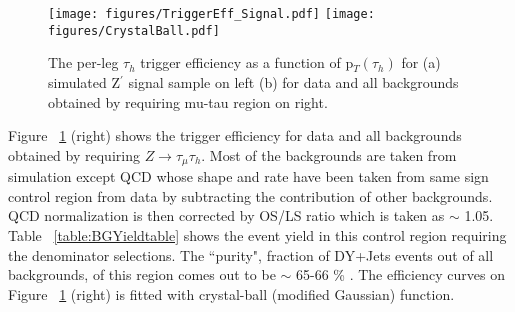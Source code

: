\begin{figure}[tbh!]
  \centering
    \texttt{[image: figures/TriggerEff\_Signal.pdf]}
    \texttt{[image: figures/CrystalBall.pdf]}
  \caption{The per-leg $\tau_{h}$ trigger efficiency as a function of p$_{T}(\tau_{h})$ for (a) simulated Z$^{\prime}$ signal sample on left (b) for data and all backgrounds obtained by requiring mu-tau region on right.}
  \label{fig:trigger}
\end{figure}

Figure ~\ref{fig:trigger} (right) shows the trigger efficiency for data and all backgrounds obtained by requiring $Z\to\tau_{\mu} \tau_{h}$. Most of the backgrounds are taken from simulation except QCD whose shape and rate have been taken from same sign control region from data by subtracting the contribution of other backgrounds. QCD normalization is  then corrected by OS/LS ratio which is taken as $\sim$ 1.05. Table ~\ref{table:BGYieldtable} shows the event yield in this control region requiring the denominator selections. The ``purity", fraction of DY+Jets events out of all backgrounds, of this region comes out to be $\sim$ 65-66 \% . The efficiency curves on Figure ~\ref{fig:trigger} (right) is fitted with crystal-ball (modified Gaussian) function.

\begin{table}[!htpb]
   \caption{Event rate in mu-tau control region after requiring denominator level selections }
   \label{table:BGYieldtable} %
 \end{table}

